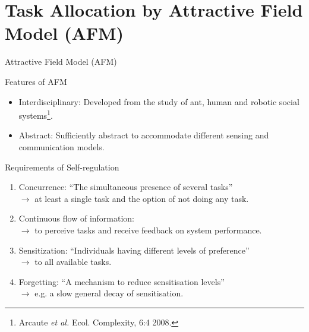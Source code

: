 \documentclass{beamer}
\begin{document}
\section{Task Allocation by Attractive Field Model (AFM)}
\begin{frame}[t]{Attractive Field Model (AFM)}
\vspace{-0.5cm}	
\begin{block}{Features of AFM}
\begin{itemize}
\item \alert{Interdisciplinary:} \small Developed from the study of ant, human and robotic social systems\footnote{\scriptsize Arcaute \textit{et al.} Ecol. Complexity, 6:4 2008.}. 
\item \normalsize \alert{Abstract:} \small Sufficiently abstract to accommodate different sensing and communication models.
\end{itemize}
\end{block}
  	
\begin{block}{Requirements of Self-regulation}
\begin{enumerate}
\item \small  \alert{Concurrence:} ``The simultaneous presence of several tasks''\\ 
$\rightarrow$ \scriptsize at least a single task and the option of not doing any task. 
\item \small  \alert{Continuous flow of information:}\\ 
$\rightarrow$ \scriptsize to perceive tasks and receive feedback on system performance.
\item \small \alert{Sensitization:} ``Individuals having different levels of preference''\\ 
$\rightarrow$ \scriptsize to all available tasks.
\item \small  \alert{Forgetting:} ``A mechanism to reduce sensitisation levels''\\ 
$\rightarrow$ \scriptsize e.g. a slow general decay of sensitisation.
\end{enumerate}
\end{block}  	
\end{frame}
\end{document}
